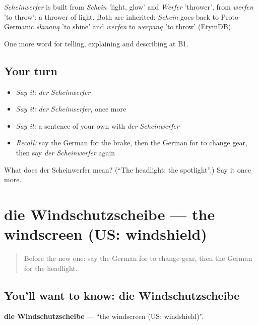\begin{cousinweb}
\emph{Scheinwerfer} is built from \emph{Schein} 'light, glow' and \emph{Werfer} 'thrower', from \emph{werfen} 'to throw': a thrower of light. Both are inherited: \emph{Schein} goes back to Proto-Germanic \emph{skīnaną} 'to shine' and \emph{werfen} to \emph{werpaną} 'to throw' (EtymDB).
\end{cousinweb}

\begin{grammarlens}[title={What you've built}]
One more word for telling, explaining and describing at B1.
\end{grammarlens}

\subsection*{Your turn}
\begin{itemize}
\raggedright
  \item \emph{Say it:} \emph{der Scheinwerfer}
  \item \emph{Say it:} \emph{der Scheinwerfer}, once more
  \item \emph{Say it:} a sentence of your own with \emph{der Scheinwerfer}
  \item \emph{Recall:} say the German for the brake, then the German for to change gear, then say \emph{der Scheinwerfer} again
\end{itemize}

\begin{tcolorbox}[breakable,colback=teal!4,colframe=teal!35!black,title={Before you move on}]
What does der Scheinwerfer mean? (\textquotedblleft{}The headlight; the spotlight\textquotedblright{}.) Say it once more.
\end{tcolorbox}
\section[die Windschutzscheibe]{die Windschutzscheibe — the windscreen (US: windshield)}

\label{lesson:GE-C400-windschutzscheibe}



\begin{quote}
Before the new one: say the German for to change gear, then the German for the headlight.
\end{quote}

\subsection*{You'll want to know: die Windschutzscheibe}
\textbf{die Windschutzscheibe} — \textquotedblleft{}the windscreen (US: windshield)\textquotedblright{}.

